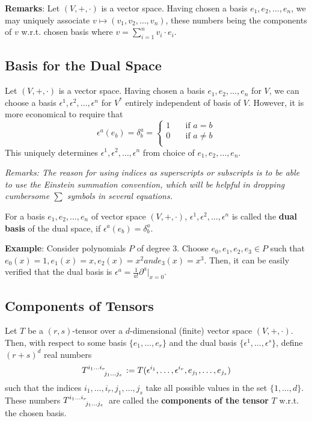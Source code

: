 \textbf{Remarks}: Let $(V,+,\cdot)$ is a vector space. Having chosen a basis $e_1,e_2,\dotsc,e_n$, we may uniquely associate $v \mapsto (v_1,v_2,\dotsc,v_n)$, these numbers being the components of $v$ w.r.t. chosen basis where $v = \displaystyle\sum_{i=1}^n v_i \cdot e_i$.

\subsection{Basis for the Dual Space}
Let $(V,+,\cdot)$ is a vector space. Having chosen a basis $e_1,e_2,\dotsc,e_n$ for $V$, we can choose a basis $\epsilon^1,\epsilon^2,\dotsc,\epsilon^n$ for $V^\ast$ entirely independent of basis of $V$. However, it is more economical to require that
\begin{equation*}
\epsilon^a (e_b) = \delta_b^a = \begin{cases}
1 &\quad \text{if } a = b \\
0 &\quad \text{if } a \neq b \\
\end{cases}
\end{equation*} This uniquely determines $\epsilon^1,\epsilon^2,\dotsc,\epsilon^n$ from choice of $e_1,e_2,\dotsc,e_n$.

\textit{Remarks: The reason for using indices as superscripts or subscripts is to be able to use the Einstein summation convention, which will be helpful in dropping cumbersome $\sum$ symbols in several equations.}

\begin{definition}
For a basis $e_1,e_2,\dotsc,e_n$ of vector space $(V,+,\cdot)$, $\epsilon^1,\epsilon^2,\dotsc,\epsilon^n$ is called the \textbf{dual basis} of the dual space, if $\epsilon^a (e_b) = \delta_b^a$.
\end{definition}

\textbf{Example}: Consider polynomials $P$ of degree 3. Choose $e_0,e_1,e_2,e_3 \in P$ such that $e_0(x) = 1, e_1(x) = x, e_2(x) = x^2 and e_3(x) = x^3$. Then, it can be easily verified that the dual basis is $\epsilon^a = \displaystyle\frac{1}{a!}\partial^a\Big|_{x=0}$.

\subsection{Components of Tensors}
\label{ss:L3_TensorComponents}
\begin{definition}
Let $T$ be a $(r,s)$-tensor over a $d$-dimensional (finite) vector space $(V,+,\cdot)$. Then, with respect to some basis $\lbrace e_1, \dotsc, e_r \rbrace$ and the dual basis $\lbrace \epsilon^1, \dotsc, \epsilon^s \rbrace$, define $(r+s)^d$ real numbers
\begin{equation*}
T\indices{^{i_1 \dots i_r}_{j_1 \dots j_s}} := T(\epsilon^{i_1}, \dotsc, \epsilon^{i_r}, e_{j_1}, \dotsc, e_{j_s})
\end{equation*} such that the indices $i_1, \dotsc, i_r, j_1, \dotsc, j_s$ take all possible values in the set $\lbrace 1,\dotsc,d \rbrace$. These numbers $T\indices{^{i_1 \dots i_r}_{j_1 \dots j_s}}$ are called the \textbf{components of the tensor} $T$ w.r.t. the chosen basis.
\end{definition}

